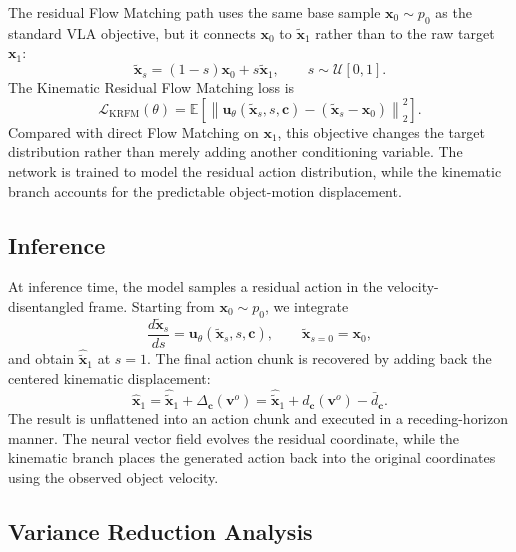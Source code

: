 \documentclass{article} %
\begin{document}
The residual Flow Matching path uses the same base sample $\mathbf x_0\sim p_0$
as the standard VLA objective, but it connects $\mathbf x_0$ to
$\widetilde{\mathbf x}_1$ rather than to the raw target $\mathbf x_1$:
\[
    \widetilde{\mathbf x}_s
    =
    (1-s)\mathbf x_0+s\widetilde{\mathbf x}_1,
    \qquad
    s\sim\mathcal U[0,1].
\]
The Kinematic Residual Flow Matching loss is
\begin{equation}
    \mathcal L_{\mathrm{KRFM}}(\theta)
    =
    \mathbb E
    \left[
        \left\|
            \mathbf u_\theta(\widetilde{\mathbf x}_s,s,\mathbf c)
            -
            (\widetilde{\mathbf x}_s-\mathbf x_0)
        \right\|_2^2
    \right].
    \label{eq:krfm_loss}
\end{equation}
Compared with direct Flow Matching on $\mathbf x_1$, this objective changes the
target distribution rather than merely adding another conditioning variable. The
network is trained to model the residual action distribution, while the
kinematic branch accounts for the predictable object-motion displacement.

\subsection{Inference}
\label{subsec:inference}

At inference time, the model samples a residual action in the
velocity-disentangled frame. Starting from $\mathbf x_0\sim p_0$, we integrate
\[
    \frac{d\widetilde{\mathbf x}_s}{ds}
    =
    \mathbf u_\theta(\widetilde{\mathbf x}_s,s,\mathbf c),
    \qquad
    \widetilde{\mathbf x}_{s=0}=\mathbf x_0,
\]
and obtain $\widehat{\widetilde{\mathbf x}}_1$ at $s=1$. The final action chunk
is recovered by adding back the centered kinematic displacement:
\begin{equation}
    \widehat{\mathbf x}_1
    =
    \widehat{\widetilde{\mathbf x}}_1
    +
    \Delta_{\mathbf c}(\mathbf v^{o})
    =
    \widehat{\widetilde{\mathbf x}}_1
    +
    d_{\mathbf c}(\mathbf v^{o})
    -
    \bar d_{\mathbf c}.
    \label{eq:residual_to_raw_inference}
\end{equation}
The result is unflattened into an action chunk and executed in a
receding-horizon manner. The neural vector field evolves the residual
coordinate, while the kinematic branch places the generated action back into
the original coordinates using the observed object velocity.



\subsection{Variance Reduction Analysis}
\label{subsec:variance_reduction}
\end{document}
